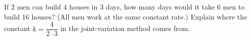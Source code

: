 If $2$ men can build $4$ houses in $3$ days, how many days would it take $6$ men to build $16$ houses? (All men work at the same constant rate.) Explain where the constant $k=\dfrac{4}{2\cdot3}$ in the joint-variation method comes from.
